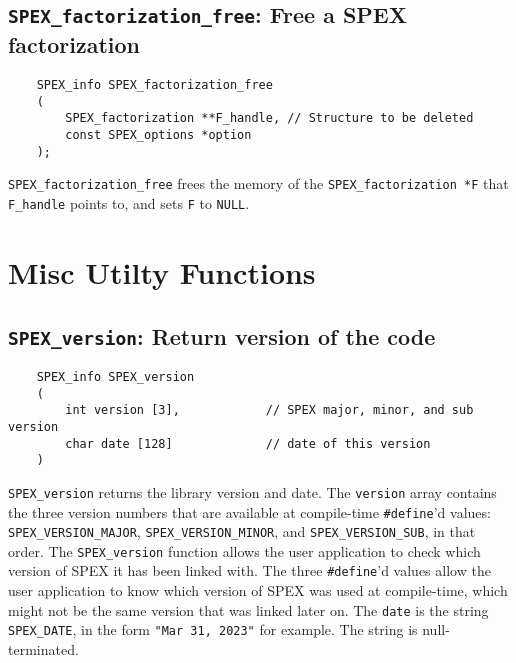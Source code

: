 \documentclass[12pt,oneside]{book}
\theoremstyle{definition}
\begin{document}
\subsection{\texttt{SPEX\_factorization\_free}: Free a SPEX factorization} \label{ss:spex_factorization_free}
\begin{mdframed}[userdefinedwidth=\textwidth]
{\footnotesize
\begin{verbatim}
    SPEX_info SPEX_factorization_free
    (
        SPEX_factorization **F_handle, // Structure to be deleted
        const SPEX_options *option
    ); 
\end{verbatim}
} \end{mdframed}

\verb|SPEX_factorization_free| frees the memory of the \verb|SPEX_factorization *F| that \verb|F_handle| points to, and sets \verb|F| to \verb|NULL|.

\newpage
\section{Misc Utilty Functions}

\subsection{\texttt{SPEX\_version}: Return version of the code}
\begin{mdframed}[userdefinedwidth=\textwidth]
{\footnotesize
\begin{verbatim}
    SPEX_info SPEX_version
    (
        int version [3],            // SPEX major, minor, and sub version
        char date [128]             // date of this version
    )
\end{verbatim}
} \end{mdframed}

\verb|SPEX_version| returns the library version and date.
The \verb'version' array contains the three version
numbers that are available at compile-time \verb'#define''d values:
\verb'SPEX_VERSION_MAJOR',
\verb'SPEX_VERSION_MINOR', and
\verb'SPEX_VERSION_SUB', in that order.  The \verb'SPEX_version' function
allows the user application to check which version of SPEX it has been
linked with.  The three \verb'#define''d values allow the user application
to know which version of SPEX was used at compile-time, which might not
be the same version that was linked later on.
The \verb'date' is the string \verb'SPEX_DATE', in the form
\verb'"Mar 31, 2023"' for example.  The string is null-terminated.
\end{document}
